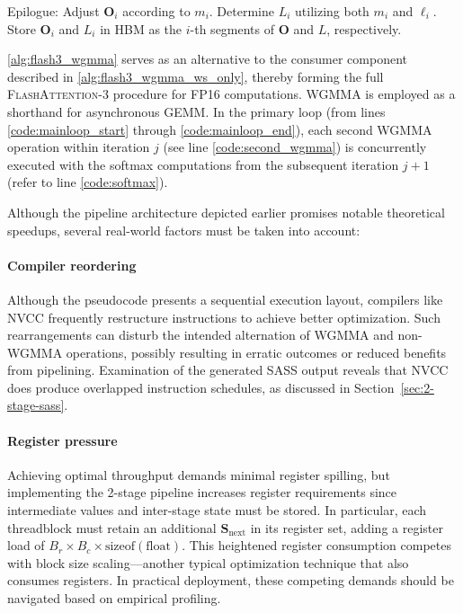 \begin{enumerate}
\begin{algorithm}[H]
\begin{algorithmic}[1]
\STATE Epilogue: Adjust $\mathbf{O}_{i}$ according to $m_{i}$. Determine $L_{i}$ utilizing both $m_{i}$ and $\ell_{i}$.
Store $\mathbf{O}_{i}$ and $L_{i}$ in HBM as the $i$-th segments of $\mathbf{O}$ and $L$, respectively.
\end{algorithmic}
\end{algorithm}

\cref{alg:flash3_wgmma} serves as an alternative to the consumer component described in \cref{alg:flash3_wgmma_ws_only}, thereby forming the full \textsc{FlashAttention-3} procedure for FP16 computations. WGMMA is employed as a shorthand for asynchronous GEMM. In the primary loop (from lines \ref{code:mainloop_start} through \ref{code:mainloop_end}), each second WGMMA operation within iteration $j$ (see line \ref{code:second_wgmma}) is concurrently executed with the softmax computations from the subsequent iteration $j+1$ (refer to line \ref{code:softmax}).

Although the pipeline architecture depicted earlier promises notable theoretical speedups, several real-world factors must be taken into account:

\paragraph{Compiler reordering} Although the pseudocode presents a sequential execution layout, compilers like NVCC frequently restructure instructions to achieve better optimization. Such rearrangements can disturb the intended alternation of WGMMA and non-WGMMA operations, possibly resulting in erratic outcomes or reduced benefits from pipelining. Examination of the generated SASS output reveals that NVCC does produce overlapped instruction schedules, as discussed in Section~\ref{sec:2-stage-sass}.

\paragraph{Register pressure} Achieving optimal throughput demands minimal register spilling, but implementing the 2-stage pipeline increases register requirements since intermediate values and inter-stage state must be stored. In particular, each threadblock must retain an additional $\mathbf{S}_{\mathrm{next}}$ in its register set, adding a register load of $B_r \times B_c \times \text{sizeof}(\text{float})$. This heightened register consumption competes with block size scaling—another typical optimization technique that also consumes registers. In practical deployment, these competing demands should be navigated based on empirical profiling.


\end{enumerate}
